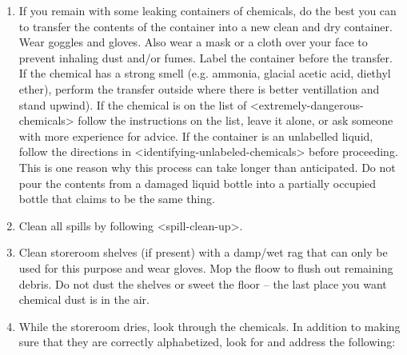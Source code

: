 \begin{enumerate}
\item{If you remain with some leaking containers of chemicals, do the best you can to transfer the contents of the container into a new clean and dry container. Wear goggles and gloves. Also wear a mask or a cloth over your face to prevent inhaling dust and/or fumes. Label the container before the transfer. If the chemical has a strong smell (e.g. ammonia, glacial acetic acid, diethyl ether), perform the transfer outside where there is better ventillation and stand upwind). If the chemical is on the list of <extremely-dangerous-chemicals> follow the instructions on the list, leave it alone, or ask someone with more experience for advice. If the container is an unlabelled liquid, follow the directions in <identifying-unlabeled-chemicals> before proceeding. This is one reason why this process can take longer than anticipated. Do not pour the contents from a damaged liquid bottle into a partially occupied bottle that claims to be the same thing.}
\item{Clean all spills by following <spill-clean-up>.}
\item{Clean storeroom shelves (if present) with a damp/wet rag that can only be used for this purpose and wear gloves. Mop the floow to flush out remaining debris. Do not dust the shelves or sweet the floor -- the last place you want chemical dust is in the air.}
\item{While the storeroom dries, look through the chemicals. In addition to making sure that they are correctly alphabetized, look for and address the following:
}
\end{enumerate}
